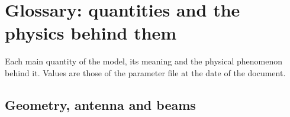 \documentclass[11pt,a4paper]{article}
\begin{document}
\section{Glossary: quantities and the physics behind them}\label{sec:glossary}
Each main quantity of the model, its meaning and the physical phenomenon behind it. Values are those of the
parameter file at the date of the document.

\subsection{Geometry, antenna and beams}
\end{document}
